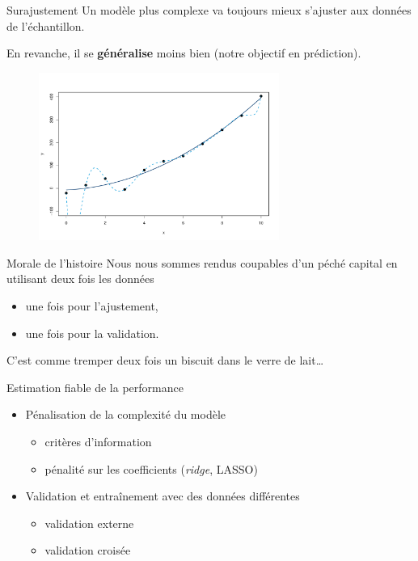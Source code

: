 \documentclass[
  ignorenonframetext,
]{beamer}
\providecommand{\tightlist}{%
  \setlength{\itemsep}{0pt}\setlength{\parskip}{0pt}}\usepackage{longtable,booktabs,array}
\begin{document}
\begin{frame}{Surajustement}
\protect\hypertarget{surajustement}{}
Un modèle plus complexe va toujours mieux s'ajuster aux données de
l'échantillon.

En revanche, il se \textbf{généralise} moins bien (notre objectif en
prédiction).

\begin{figure}

{\centering \includegraphics[width=0.7\textwidth,height=\textheight]{MATH60602-diapos4_files/figure-beamer/overfitting-1.pdf}

}

\end{figure}
\end{frame}

\begin{frame}{Morale de l'histoire}
\protect\hypertarget{morale-de-lhistoire}{}
Nous nous sommes rendus coupables d'un péché capital en utilisant deux
fois les données

\begin{itemize}
\tightlist
\item
  une fois pour l'ajustement,
\item
  une fois pour la validation.
\end{itemize}

C'est comme tremper deux fois un biscuit dans le verre de lait\ldots{}
\end{frame}

\begin{frame}{Estimation fiable de la performance}
\protect\hypertarget{estimation-fiable-de-la-performance}{}
\begin{itemize}
\tightlist
\item
  Pénalisation de la complexité du modèle

  \begin{itemize}
  \tightlist
  \item
    critères d'information
  \item
    pénalité sur les coefficients (\emph{ridge}, LASSO)
  \end{itemize}
\item
  Validation et entraînement avec des données différentes

  \begin{itemize}
  \tightlist
  \item
    validation externe
  \item
    validation croisée
  \end{itemize}
\end{itemize}
\end{frame}
\end{document}
